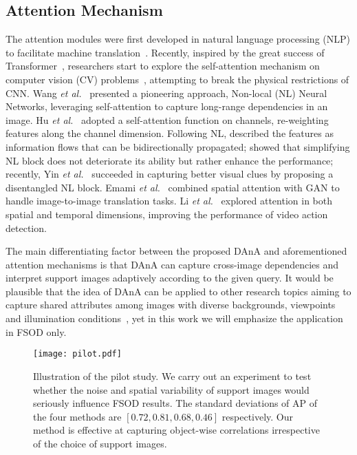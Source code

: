 \documentclass[journal]{IEEEtran}
\newcommand{\etal}{\textit{et al.}}
\begin{document}
\subsection{Attention Mechanism}
The attention modules were first developed in natural language processing (NLP) to facilitate machine translation~\cite{bahdanau2014neural, luong2015effective, gehring2017convolutional}.
Recently, inspired by the great success of Transformer~\cite{vaswani2017attention}, researchers start to explore the self-attention mechanism on computer vision (CV) problems~\cite{wang2018non, zhao2018psanet, fu2019dual, cao2019gcnet, hu2019local, zhu2019empirical}, attempting to break the physical restrictions of CNN.
Wang \etal~\cite{wang2018non} presented a pioneering approach, Non-local (NL) Neural Networks, leveraging self-attention to capture long-range dependencies in an image.
Hu \etal~\cite{hu2018squeeze} adopted a self-attention function on channels, re-weighting features along the channel dimension.
Following NL, \cite{zhao2018psanet} described the features as information flows that can be bidirectionally propagated; \cite{cao2019gcnet} showed that simplifying NL block does not deteriorate its ability but rather enhance the performance; recently, Yin \etal~\cite{yin2020disentangled} succeeded in capturing better visual clues by proposing a disentangled NL block.
Emami \etal~\cite{emami2020spa} combined spatial attention with GAN to handle image-to-image translation tasks.
Li \etal~\cite{li2020spatio} explored attention in both spatial and temporal dimensions, improving the performance of video action detection.


The main differentiating factor between the proposed DAnA and aforementioned attention mechanisms is that DAnA can capture cross-image dependencies and interpret support images adaptively according to the given query.
It would be plausible that the idea of DAnA can be applied to other research topics aiming to capture shared attributes among images with diverse backgrounds, viewpoints and illumination conditions~\cite{zhang2015self, han2017unified, fan2021group}, yet in this work we will emphasize the application in FSOD only.


\begin{figure}[t]
    \centering
    \texttt{[image: pilot.pdf]}
    \caption{
    Illustration of the pilot study.
    We carry out an experiment to test whether the noise and spatial variability of support images would seriously influence FSOD results.
    The standard deviations of AP of the four methods are $[0.72, 0.81, 0.68, 0.46]$ respectively.
    Our method is effective at capturing object-wise correlations irrespective of the choice of support images.
    }
    \label{fig:pilot}
\end{figure}
\end{document}
